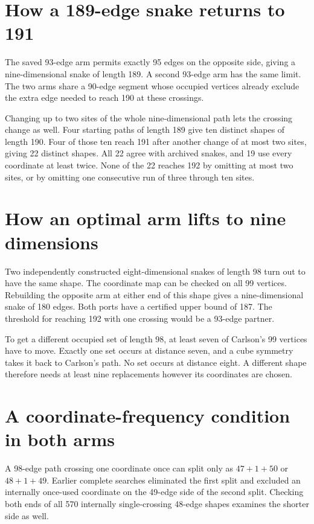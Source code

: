 \documentclass[11pt,a4paper]{article}
\begin{document}
\section{How a 189-edge snake returns to 191}
The saved 93-edge arm permits exactly 95 edges on the opposite side, giving a nine-dimensional snake of length 189. A second 93-edge arm has the same limit. The two arms share a 90-edge segment whose occupied vertices already exclude the extra edge needed to reach 190 at these crossings.

Changing up to two sites of the whole nine-dimensional path lets the crossing change as well. Four starting paths of length 189 give ten distinct shapes of length 190. Four of those ten reach 191 after another change of at most two sites, giving 22 distinct shapes. All 22 agree with archived snakes, and 19 use every coordinate at least twice. None of the 22 reaches 192 by omitting at most two sites, or by omitting one consecutive run of three through ten sites.

\section{How an optimal arm lifts to nine dimensions}
Two independently constructed eight-dimensional snakes of length 98 turn out to have the same shape. The coordinate map can be checked on all 99 vertices. Rebuilding the opposite arm at either end of this shape gives a nine-dimensional snake of 180 edges. Both ports have a certified upper bound of 187. The threshold for reaching 192 with one crossing would be a 93-edge partner.

To get a different occupied set of length 98, at least seven of Carlson's 99 vertices have to move. Exactly one set occurs at distance seven, and a cube symmetry takes it back to Carlson's path. No set occurs at distance eight. A different shape therefore needs at least nine replacements however its coordinates are chosen.

\section{A coordinate-frequency condition in both arms}
A 98-edge path crossing one coordinate once can split only as \(47+1+50\) or \(48+1+49\). Earlier complete searches eliminated the first split and excluded an internally once-used coordinate on the 49-edge side of the second split. Checking both ends of all 570 internally single-crossing 48-edge shapes examines the shorter side as well.
\end{document}
